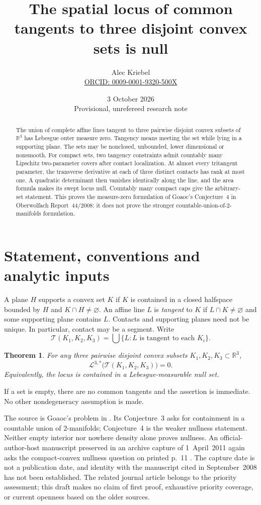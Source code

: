 \documentclass[11pt]{article}
\title{The spatial locus of common tangents to three disjoint convex sets is null}
\author{Alec Kriebel\\\small\href{https://orcid.org/0009-0001-9320-500X}{ORCID: 0009-0001-9320-500X}}
\date{3 October 2026\\\small Provisional, unrefereed research note}
\newcommand{\R}{\mathbb R}
\newcommand{\Leb}{\mathcal L}
\newtheorem{theorem}{Theorem}
\theoremstyle{remark}
\begin{document}
\maketitle
\begin{abstract}
The union of complete affine lines tangent to three pairwise disjoint convex subsets of $\R^3$ has Lebesgue outer measure zero. Tangency means meeting the set while lying in a supporting plane. The sets may be nonclosed, unbounded, lower dimensional or nonsmooth. For compact sets, two tangency constraints admit countably many Lipschitz two-parameter covers after contact localization. At almost every tritangent parameter, the transverse derivative at each of three distinct contacts has rank at most one. A quadratic determinant then vanishes identically along the line, and the area formula makes its swept locus null. Countably many compact caps give the arbitrary-set statement. This proves the measure-zero formulation of Goaoc's Conjecture~4 in Oberwolfach Report~44/2008; it does not prove the stronger countable-union-of-$2$-manifolds formulation.
\end{abstract}

\section{Statement, conventions and analytic inputs}
A plane $H$ supports a convex set $K$ if $K$ is contained in a closed halfspace bounded by $H$ and $K\cap H\ne\varnothing$. An affine line $L$ is \emph{tangent} to $K$ if $L\cap K\ne\varnothing$ and some supporting plane contains $L$. Contacts and supporting planes need not be unique. In particular, contact may be a segment. Write
\[
\mathcal T(K_1,K_2,K_3)=\bigcup\{L:L\text{ is tangent to each }K_i\}.
\]
\begin{theorem}\label{thm:main}
For any three pairwise disjoint convex subsets $K_1,K_2,K_3\subset\R^3$,
\[
\Leb^{3,*}\bigl(\mathcal T(K_1,K_2,K_3)\bigr)=0.
\]
Equivalently, the locus is contained in a Lebesgue-measurable null set.
\end{theorem}
If a set is empty, there are no common tangents and the assertion is immediate. No other nondegeneracy assumption is made.

The source is Goaoc's problem in \cite[section~13, p.~2552]{goaoc2008}. Its Conjecture~3 asks for containment in a countable union of $2$-manifolds; Conjecture~4 is the weaker nullness statement. Neither empty interior nor nowhere density alone proves nullness. An official-author-host manuscript preserved in an archive capture of 1~April~2011 again asks the compact-convex nullness question on printed p.~11 \cite{demouthgoaoc}. The capture date is not a publication date, and identity with the manuscript cited in September~2008 has not been established. The related journal article \cite{cheong2024} belongs to the priority assessment; this draft makes no claim of first proof, exhaustive priority coverage, or current openness based on the older sources.
\end{document}
